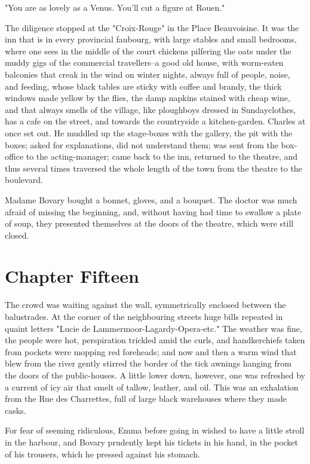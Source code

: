 \documentclass{tufte-book}
\begin{document}
"You are as lovely as a Venus. You'll cut a figure at Rouen."

The diligence stopped at the "Croix-Rouge" in the Place Beauvoisine. It
was the inn that is in every provincial faubourg, with large stables
and small bedrooms, where one sees in the middle of the court chickens
pilfering the oats under the muddy gigs of the commercial travellers--a
good old house, with worm-eaten balconies that creak in the wind on
winter nights, always full of people, noise, and feeding, whose black
tables are sticky with coffee and brandy, the thick windows made yellow
by the flies, the damp napkins stained with cheap wine, and that always
smells of the village, like ploughboys dressed in Sundayclothes, has
a cafe on the street, and towards the countryside a kitchen-garden.
Charles at once set out. He muddled up the stage-boxes with the gallery,
the pit with the boxes; asked for explanations, did not understand them;
was sent from the box-office to the acting-manager; came back to the
inn, returned to the theatre, and thus several times traversed the whole
length of the town from the theatre to the boulevard.

Madame Bovary bought a bonnet, gloves, and a bouquet. The doctor was
much afraid of missing the beginning, and, without having had time to
swallow a plate of soup, they presented themselves at the doors of the
theatre, which were still closed.




\chapter{Chapter Fifteen}

The crowd was waiting against the wall, symmetrically enclosed between
the balustrades. At the corner of the neighbouring streets huge bills
repeated in quaint letters "Lucie de Lammermoor-Lagardy-Opera-etc." The
weather was fine, the people were hot, perspiration trickled amid the
curls, and handkerchiefs taken from pockets were mopping red foreheads;
and now and then a warm wind that blew from the river gently stirred the
border of the tick awnings hanging from the doors of the public-houses.
A little lower down, however, one was refreshed by a current of icy air
that smelt of tallow, leather, and oil. This was an exhalation from
the Rue des Charrettes, full of large black warehouses where they made
casks.

For fear of seeming ridiculous, Emma before going in wished to have a
little stroll in the harbour, and Bovary prudently kept his tickets in
his hand, in the pocket of his trousers, which he pressed against his
stomach.
\end{document}
